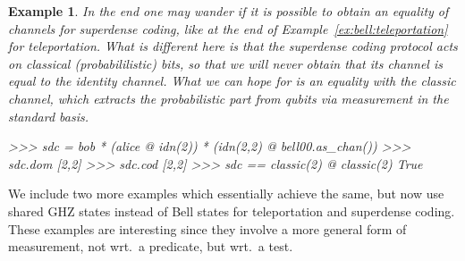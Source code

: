 \documentclass[leqno]{tufte-book} %
\newtheorem{example}[theorem]{Example}
\begin{document}
\begin{example}
In the end one may wander if it is possible to obtain an equality of
channels for superdense coding, like at the end of
Example~\ref{ex:bell:teleportation} for teleportation. What is
different here is that the superdense coding protocol acts on
\emph{classical} (probabililistic) bits, so that we will never obtain
that its channel is equal to the identity channel. What we can hope
for is an equality with the classic channel, which extracts the
probabilistic part from qubits via measurement in the standard basis.
\begin{python}
>>> sdc = bob * (alice @ idn(2)) * (idn(2,2) @ bell00.as_chan())
>>> sdc.dom
[2,2]
>>> sdc.cod
[2,2]
>>> sdc == classic(2) @ classic(2)
True
\end{python}
\end{example}


We include two more examples which essentially achieve the same, but
now use shared GHZ states instead of Bell states for teleportation and
superdense coding. These examples are interesting since they involve a
more general form of measurement, not wrt.~a predicate, but wrt.~a
test.


\end{document}
